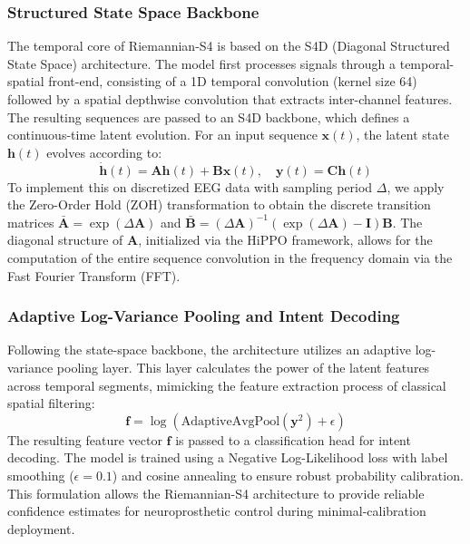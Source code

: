 \documentclass[11pt,a4paper]{article}
\begin{document}
\subsubsection{Structured State Space Backbone}
The temporal core of Riemannian-S4 is based on the S4D (Diagonal Structured State Space) architecture. The model first processes signals through a temporal-spatial front-end, consisting of a 1D temporal convolution (kernel size 64) followed by a spatial depthwise convolution that extracts inter-channel features. The resulting sequences are passed to an S4D backbone, which defines a continuous-time latent evolution. For an input sequence $\mathbf{x}(t)$, the latent state $\mathbf{h}(t)$ evolves according to:
\begin{equation}
    \dot{\mathbf{h}}(t) = \mathbf{A}\mathbf{h}(t) + \mathbf{B}\mathbf{x}(t), \quad \mathbf{y}(t) = \mathbf{C}\mathbf{h}(t)
\end{equation}
To implement this on discretized EEG data with sampling period $\Delta$, we apply the Zero-Order Hold (ZOH) transformation to obtain the discrete transition matrices $\bar{\mathbf{A}} = \exp(\Delta \mathbf{A})$ and $\bar{\mathbf{B}} = (\Delta \mathbf{A})^{-1}(\exp(\Delta \mathbf{A}) - \mathbf{I})\mathbf{B}$. The diagonal structure of $\mathbf{A}$, initialized via the HiPPO framework, allows for the computation of the entire sequence convolution in the frequency domain via the Fast Fourier Transform (FFT).

\subsubsection{Adaptive Log-Variance Pooling and Intent Decoding}
Following the state-space backbone, the architecture utilizes an adaptive log-variance pooling layer. This layer calculates the power of the latent features across temporal segments, mimicking the feature extraction process of classical spatial filtering:
\begin{equation}
    \mathbf{f} = \log(\text{AdaptiveAvgPool}(\mathbf{y}^2) + \epsilon)
\end{equation}
The resulting feature vector $\mathbf{f}$ is passed to a classification head for intent decoding. The model is trained using a Negative Log-Likelihood loss with label smoothing ($\epsilon=0.1$) and cosine annealing to ensure robust probability calibration. This formulation allows the Riemannian-S4 architecture to provide reliable confidence estimates for neuroprosthetic control during minimal-calibration deployment.
\end{document}
